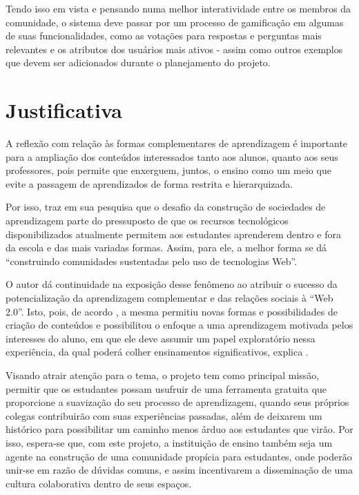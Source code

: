 Tendo isso em vista e pensando numa melhor interatividade entre os membros da comunidade, o sistema deve passar por um processo de \gls{gamificação} em algumas de suas funcionalidades, como as votações para respostas e perguntas mais relevantes e os atributos dos usuários mais ativos  - assim como outros exemplos que devem ser adicionados durante o planejamento do projeto.


\section{Justificativa}
A reflexão com relação às formas complementares de aprendizagem é importante para a ampliação dos conteúdos interessados tanto aos alunos, quanto aos seus professores, pois permite que enxerguem, juntos, o ensino como um meio que evite a passagem de aprendizados de forma restrita e hierarquizada.

Por isso,  traz em sua pesquisa que o desafio da construção de sociedades de aprendizagem parte do pressuposto de que os recursos tecnológicos disponibilizados atualmente permitem aos estudantes aprenderem dentro e fora da escola e das mais variadas formas. Assim, para ele, a melhor forma se dá ``construindo comunidades sustentadas pelo uso de tecnologias Web''.

O autor dá continuidade na exposição desse fenômeno ao atribuir o sucesso da potencialização da aprendizagem complementar e das relações sociais à ``Web 2.0''. Isto, pois, de acordo , a mesma permitiu novas formas e possibilidades de criação de conteúdos e possibilitou o enfoque a uma aprendizagem motivada pelos interesses do aluno, em que ele deve assumir um papel exploratório nessa experiência, da qual poderá colher ensinamentos significativos, explica .

Visando atrair atenção para o tema, o projeto tem como principal missão, permitir que os estudantes possam usufruir de uma ferramenta gratuita que proporcione a suavização do seu processo de aprendizagem, quando seus próprios colegas contribuirão com suas experiências passadas, além de deixarem um histórico para possibilitar um caminho menos árduo aos estudantes que virão. Por isso, espera-se que, com este projeto, a instituição de ensino também seja um agente na construção de uma comunidade propícia para estudantes, onde poderão unir-se em razão de dúvidas comuns, e assim incentivarem a disseminação de uma cultura colaborativa dentro de seus espaços.

